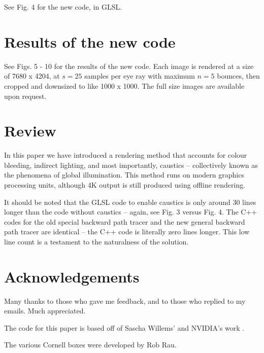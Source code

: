 \documentclass[12pt]{article}
\begin{document}
See Fig. 4 for the new code, in GLSL.








\section{Results of the new code}

See Figs. 5 - 10 for the results of the new code.
Each image is rendered at a size of 7680 x 4204, at $s = 25$ samples per eye ray with maximum $n = 5$ bounces, then cropped and downsized to like 1000 x 1000.
The full size images are available upon request.









\section{Review}

In this paper we have introduced a rendering method that accounts for colour bleeding, indirect lighting, and most importantly, caustics -- collectively known as the phenomena of global illumination.
This method runs on modern graphics processing units, although 4K output is still produced using offline rendering.

It should be noted that the GLSL code to enable caustics is only around $30$ lines longer than the code without caustics -- again, see Fig. 3 versus Fig. 4.
The C++ codes for the old special backward path tracer and the new general backward path tracer are identical -- the C++ code is literally zero lines longer.
This low line count is a testament to the naturalness of the solution.





\section{Acknowledgements}

Many thanks to those who gave me feedback, and to those who replied to my emails.
Much appreciated.

The code for this paper is based off of Sascha Willems' and NVIDIA's work \cite{willems1, willems2, nvidia}.

The various Cornell boxes were developed by Rob Rau.
\end{document}
